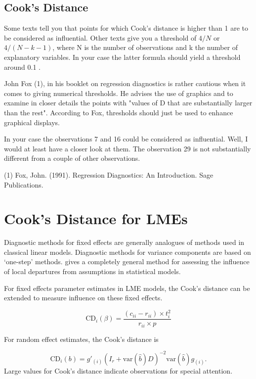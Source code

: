 \documentclass[12pt, a4paper]{report}
\theoremstyle{plain}
\theoremstyle{definition}
\theoremstyle{remark}
\begin{document}
\subsection{Cook's Distance}
Some texts tell you that points for which Cook's distance is higher than 1 are to be considered as influential. Other texts give you a threshold of $4/N$ or $4/(N−k−1)$, where N is the number of observations and k the number of explanatory variables. In your case the latter formula should yield a threshold around 0.1 .

John Fox (1), in his booklet on regression diagnostics is rather cautious when it comes to giving numerical thresholds. He advises the use of graphics and to examine in closer details the points with "values of D that are substantially larger than the rest". According to Fox, thresholds should just be used to enhance graphical displays.

In your case the observations 7 and 16 could be considered as influential. Well, I would at least have a closer look at them. The observation 29 is not substantially different from a couple of other observations.

(1) Fox, John. (1991). Regression Diagnostics: An Introduction. Sage Publications.
		\section{Cook's Distance for LMEs} %
		Diagnostic methods for fixed effects are generally analogues of methods used in classical linear models.
		Diagnostic methods for variance components are based on `one-step' methods. \citet{cook86} gives a completely general method for assessing the influence of local departures from assumptions in statistical models.
		
		For fixed effects parameter estimates in LME models, the  Cook's distance can be extended to measure influence on these fixed effects.
		
		\[
		\mbox{CD}_{i}(\beta) = \frac{(c_{ii} - r_{ii}) \times t^2_{i}}{r_{ii} \times p}
		\]
		
		For random effect estimates, the  Cook's distance is
		
		\[
		\mbox{CD}_{i}(b) = g{\prime}_{(i)} (I_{r} + \mbox{var}(\hat{b})D)^{-2}\mbox{var}(\hat{b})g_{(i)}.
		\]
		Large values for Cook's distance indicate observations for special attention.
		
\end{document}
